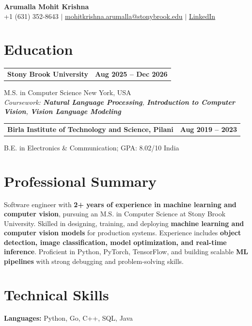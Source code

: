 \documentclass[letterpaper,10pt]{article}
\makeatletter
\newcommand{\entry}[2]{%
  \noindent
  \begin{tabularx}{\linewidth}
    {@{}>{\raggedright\arraybackslash}X@{\hspace{6pt}}r@{}}
    \textbf{#1} & #2
  \end{tabularx}\par
}
\makeatother
\begin{document}
\begin{center}
    {\LARGE\bfseries Arumalla Mohit Krishna}\\[3pt]
    +1 (631) 352-8643 $|$
    \href{mailto:mohitkrishna.arumalla@stonybrook.edu}
    {mohitkrishna.arumalla@stonybrook.edu} $|$
    \href{https://linkedin.com/in/mohit-krishna-arumalla}
    {LinkedIn}
\end{center}
\vspace{-8pt}

\section{Education}

\entry
  {\textbf{Stony Brook University}}
  {\textbf{Aug 2025 -- Dec 2026}}

M.S. in Computer Science \hfill New York, USA\\
\textit{
Coursework: \textbf{Natural Language Processing},
\textbf{Introduction to Computer Vision}, \textbf{Vision Language Modeling}
}
\vspace{3pt}

\entry
  {\textbf{Birla Institute of Technology and Science, Pilani}}
  {\textbf{Aug 2019 -- 2023}}

B.E. in Electronics \& Communication; GPA: 8.02/10 \hfill India
\section{Professional Summary}

Software engineer with \textbf{2+ years of experience in machine learning and computer vision}, pursuing an M.S. in Computer Science at Stony Brook University. Skilled in designing, training, and deploying \textbf{machine learning and computer vision models} for production systems. Experience includes \textbf{object detection, image classification, model optimization, and real-time inference}. Proficient in Python, PyTorch, TensorFlow, and building scalable \textbf{ML pipelines} with strong debugging and problem-solving skills.

\section{Technical Skills}

\textbf{Languages:}
Python, Go, C++, SQL, Java\\
\end{document}
